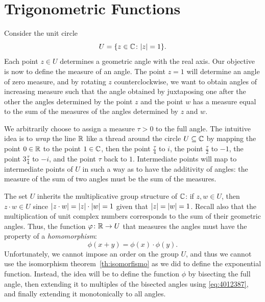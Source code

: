 \section{Trigonometric Functions}
\label{sec:funzioni_trigonometriche}%

Consider the unit circle 
\[
  U = {\left\{ z\in {\mathbb C}\colon {\left|z\right|} = 1 \right\}}.
\]
Each point $z\in U$ determines a geometric angle with the real axis.
Our objective is now to define the measure of an angle.
The point $z=1$ will determine an angle of zero measure, and 
by rotating $z$ counterclockwise, we want to obtain angles 
of increasing measure such that the angle obtained 
by juxtaposing one after the other the angles determined 
by the point $z$ and the point $w$ has a measure equal to the sum of the
measures
of the angles determined by $z$ and $w$.

We arbitrarily choose to assign a measure $\tau>0$ to the full angle.
The intuitive idea is to \emph{wrap} the line ${\mathbb R}$ like a thread 
around the circle $U\subseteq {\mathbb C}$ 
by mapping the point $0\in {\mathbb R}$ to the point $1\in {\mathbb C}$,
then the point $\frac \tau 4$ to $i$, the point $\frac \tau 2$ to $-1$,
the point $3\frac \tau 4$ to $-i$, and the point $\tau$ back to $1$.
Intermediate points will map to intermediate points of $U$ in such a way as to
have
the additivity of angles: the measure of the sum of two angles must 
be the sum of the measures.

The set $U$ inherits the multiplicative group structure of ${\mathbb C}$: 
if $z,w\in U$, 
then $z\cdot w \in U$ since ${\left|z\cdot w\right|} = {\left|z\right|}\cdot {\left|w\right|} = 1$
given that ${\left|z\right|}={\left|w\right|}=1$.
Recall also that the multiplication of unit complex numbers 
corresponds to the sum of their geometric angles.
Thus, the function $\varphi\colon {\mathbb R} \to U$ that measures the angles 
must have the property of a \emph{homomorphism}:
\begin{equation}\label{eq:4012387}
  \phi(x+y) = \phi(x)\cdot \phi(y).
\end{equation}
Unfortunately, we cannot impose an order on the group $U$, and 
thus we cannot use the isomorphism theorem~\ref{th:isomorfismo} 
as we did to define the exponential function.
Instead, the idea will be to define the function $\phi$ 
by bisecting the full angle, then extending it to multiples 
of the bisected angles using \eqref{eq:4012387},
and finally extending it monotonically to all angles.

